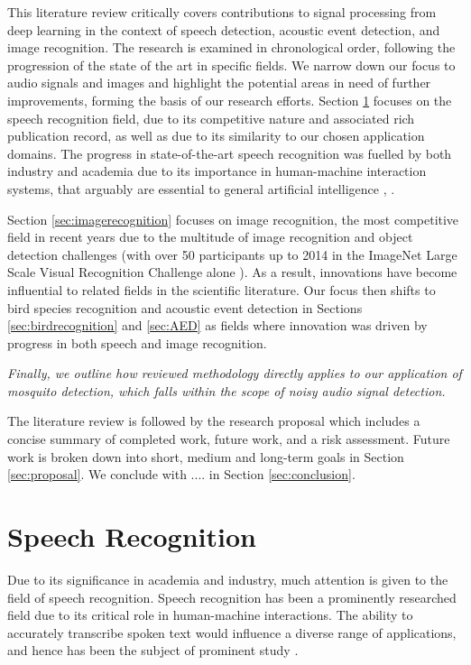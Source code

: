 \documentclass[12pt]{llncs}
\newcommand{\ikn}[1]{\todo[size = \small, color=orange!30]{[ik] #1}}
\begin{document}
This literature review critically covers contributions to signal processing from deep learning in the context of speech detection, acoustic event detection, and image recognition. The research is examined in chronological order, following the progression of the state of the art in specific fields. We narrow down our focus to audio signals and images and highlight the potential areas in need of further improvements\ikn{Need to do this}, forming the basis of our research efforts. Section \ref{sec:speechrecognition} focuses on the speech recognition field, due to its competitive nature and associated rich publication record, as well as due to its similarity to our chosen application domains.\ikn{Which are?} The progress in state-of-the-art speech recognition was fuelled by both industry and academia due to its importance in human-machine interaction systems, that arguably are essential to general artificial intelligence \cite{rabiner1993fundamentals}, \cite{juang2005automatic}.

Section \ref{sec:imagerecognition} focuses on image recognition, the most competitive field in recent years due to the multitude of image recognition and object detection challenges (with over 50 participants up to 2014 in the ImageNet Large Scale Visual Recognition Challenge alone \cite{russakovsky2014imagenet}). As a result, innovations have become influential to related fields in the scientific literature.
Our focus then shifts to bird species recognition and acoustic event detection in Sections \ref{sec:birdrecognition} and \ref{sec:AED} as fields where innovation was driven by progress in both speech and image recognition.


\emph{Finally, we outline how reviewed methodology directly applies to our application of mosquito detection, which falls within the scope of noisy audio signal detection.} \ikn{To do}

The literature review is followed by the research proposal which includes a concise summary of completed work, future work, and a risk assessment. Future work is broken down into short, medium and long-term goals in Section \ref{sec:proposal}. We conclude with .... in Section \ref{sec:conclusion}.



\section{Speech Recognition}
\label{sec:speechrecognition}
Due to its significance in academia and industry, much attention is given to the field of speech recognition. Speech recognition has been a prominently researched field due to its critical role in human-machine interactions. The ability to accurately transcribe spoken text would influence a diverse range of applications, and hence has been the subject of prominent study \cite{juang2005automatic}. 
\end{document}
